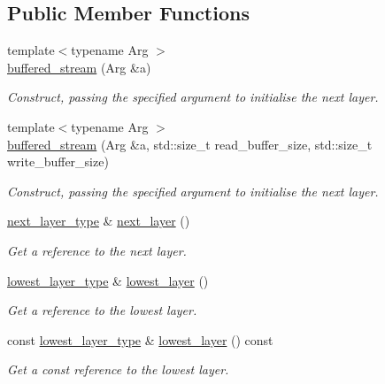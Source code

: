\subsection*{Public Member Functions}
\begin{DoxyCompactItemize}
\item 
{\footnotesize template$<$typename Arg $>$ }\\\hyperlink{classasio_1_1buffered__stream_a1f70394aed9738ce24f7e434b4953060}{buffered\+\_\+stream} (Arg \&a)
\begin{DoxyCompactList}\small\item\em Construct, passing the specified argument to initialise the next layer. \end{DoxyCompactList}\item 
{\footnotesize template$<$typename Arg $>$ }\\\hyperlink{classasio_1_1buffered__stream_aee66056c709179fb7320c27c62f0af59}{buffered\+\_\+stream} (Arg \&a, std\+::size\+\_\+t read\+\_\+buffer\+\_\+size, std\+::size\+\_\+t write\+\_\+buffer\+\_\+size)
\begin{DoxyCompactList}\small\item\em Construct, passing the specified argument to initialise the next layer. \end{DoxyCompactList}\item 
\hyperlink{classasio_1_1buffered__stream_acde0aacfaa4ec31697fe87ae83704af1}{next\+\_\+layer\+\_\+type} \& \hyperlink{classasio_1_1buffered__stream_a3972cdb3cbe1e0b2219c9ac82fbf370b}{next\+\_\+layer} ()
\begin{DoxyCompactList}\small\item\em Get a reference to the next layer. \end{DoxyCompactList}\item 
\hyperlink{classasio_1_1buffered__stream_aed77dcc210c8f8bc905715340a498bc2}{lowest\+\_\+layer\+\_\+type} \& \hyperlink{classasio_1_1buffered__stream_a6b4b6adeaeabd2e2b97d4fd99c12a4d6}{lowest\+\_\+layer} ()
\begin{DoxyCompactList}\small\item\em Get a reference to the lowest layer. \end{DoxyCompactList}\item 
const \hyperlink{classasio_1_1buffered__stream_aed77dcc210c8f8bc905715340a498bc2}{lowest\+\_\+layer\+\_\+type} \& \hyperlink{classasio_1_1buffered__stream_a18b1c4e897b84218ee2e50544303646e}{lowest\+\_\+layer} () const 
\begin{DoxyCompactList}\small\item\em Get a const reference to the lowest layer. \end{DoxyCompactList}\item 

\end{DoxyCompactItemize}
